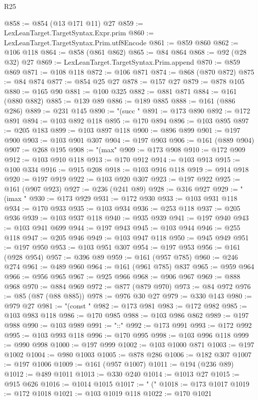 \begin{lexlean}{R25}
\begin{coremodule}
@858 := @854 (@13 @171 @11) @27
@859 := LexLeanTarget.TargetSyntax.Expr.prim
@860 := LexLeanTarget.TargetSyntax.Prim.utf8Encode
@861 := @859 @860
@862 := @106 @118
@864 := @858 (@861 @862)
@865 := @84 @864
@868 := @92 (@28 @32) @27
@869 := LexLeanTarget.TargetSyntax.Prim.append
@870 := @859 @869
@871 := @108 @118
@872 := @106 @871
@874 := @868 (@870 @872)
@875 := @84 @874
@877 := @854 @25 @27
@878 := @157 @27
@879 := @878 @105
@880 := @165 @90
@881 := @100 @325
@882 := @881 @871
@884 := @161 (@880 @882)
@885 := @139 @89
@886 := @189 @885
@888 := @161 (@886 @286)
@889 := @231 @145
@890 := "(succ "
@891 := @173 @890
@892 := @172 @891
@894 := @103 @892 @118
@895 := @170 @894
@896 := @103 @895
@897 := @205 @183
@899 := @103 @897 @118
@900 := @896 @899
@901 := @197 @900
@903 := @103 @901 @307
@904 := @197 @903
@906 := @161 (@889 @904)
@907 := @268 @195
@908 := "(max"
@909 := @173 @908
@910 := @172 @909
@912 := @103 @910 @118
@913 := @170 @912
@914 := @103 @913
@915 := @100 @334
@916 := @915 @208
@918 := @103 @916 @118
@919 := @914 @918
@920 := @197 @919
@922 := @103 @920 @307
@923 := @197 @922
@925 := @161 (@907 @923)
@927 := @236 (@241 @89)
@928 := @316 @927
@929 := "(imax "
@930 := @173 @929
@931 := @172 @930
@933 := @103 @931 @118
@934 := @170 @933
@935 := @103 @934
@936 := @253 @118
@937 := @205 @936
@939 := @103 @937 @118
@940 := @935 @939
@941 := @197 @940
@943 := @103 @941 @699
@944 := @197 @943
@945 := @103 @944
@946 := @255 @118
@947 := @205 @946
@949 := @103 @947 @118
@950 := @945 @949
@951 := @197 @950
@953 := @103 @951 @307
@954 := @197 @953
@956 := @161 (@928 @954)
@957 := @396 @89
@959 := @161 (@957 @785)
@960 := @246 @274
@961 := @489 @960
@964 := @161 (@961 @785) @837
@965 := @959 @964
@966 := @956 @965
@967 := @925 @966
@968 := @906 @967
@969 := @888 @968
@970 := @884 @969
@972 := @877 (@879 @970)
@973 := @84 @972
@976 := @85 (@87 (@88 @885))
@978 := @976 @30 @27
@979 := @330 @143
@980 := @979 @27
@981 := "(const "
@982 := @173 @981
@983 := @172 @982
@985 := @103 @983 @118
@986 := @170 @985
@988 := @103 @986 @862
@989 := @197 @988
@990 := @103 @989
@991 := "::"
@992 := @173 @991
@993 := @172 @992
@995 := @103 @993 @118
@996 := @170 @995
@998 := @103 @996 @118
@999 := @990 @998
@1000 := @197 @999
@1002 := @103 @1000 @871
@1003 := @197 @1002
@1004 := @980 @1003
@1005 := @878 @286
@1006 := @182 @307
@1007 := @197 @1006
@1009 := @161 (@957 @1007)
@1011 := @194 (@236 @89)
@1012 := @489 @1011
@1013 := @330 @240
@1014 := @1013 @27
@1015 := @915 @626
@1016 := @1014 @1015
@1017 := " ("
@1018 := @173 @1017
@1019 := @172 @1018
@1021 := @103 @1019 @118
@1022 := @170 @1021

\end{coremodule}
\end{lexlean}
